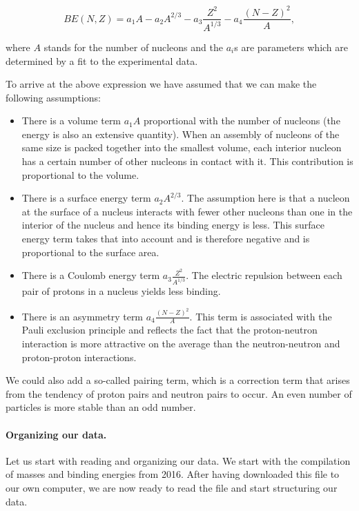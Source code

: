 \documentclass[%
oneside,                 %
final,                   %
10pt]{article}
\begin{document}
\[ 
BE(N,Z) = a_1A-a_2A^{2/3}-a_3\frac{Z^2}{A^{1/3}}-a_4\frac{(N-Z)^2}{A},
\]

where $A$ stands for the number of nucleons and the $a_i$s are parameters which are determined by a fit 
to the experimental data.  




To arrive at the above expression we have assumed that we can make the following assumptions:

\begin{itemize}
 \item There is a volume term $a_1A$ proportional with the number of nucleons (the energy is also an extensive quantity). When an assembly of nucleons of the same size is packed together into the smallest volume, each interior nucleon has a certain number of other nucleons in contact with it. This contribution is proportional to the volume.

 \item There is a surface energy term $a_2A^{2/3}$. The assumption here is that a nucleon at the surface of a nucleus interacts with fewer other nucleons than one in the interior of the nucleus and hence its binding energy is less. This surface energy term takes that into account and is therefore negative and is proportional to the surface area.

 \item There is a Coulomb energy term $a_3\frac{Z^2}{A^{1/3}}$. The electric repulsion between each pair of protons in a nucleus yields less binding. 

 \item There is an asymmetry term $a_4\frac{(N-Z)^2}{A}$. This term is associated with the Pauli exclusion principle and reflects the fact that the proton-neutron interaction is more attractive on the average than the neutron-neutron and proton-proton interactions.
\end{itemize}

\noindent
We could also add a so-called pairing term, which is a correction term that
arises from the tendency of proton pairs and neutron pairs to
occur. An even number of particles is more stable than an odd number. 


\paragraph{Organizing our data.}
Let us start with reading and organizing our data. 
We start with the compilation of masses and binding energies from 2016.
After having downloaded this file to our own computer, we are now ready to read the file and start structuring our data.
\end{document}
